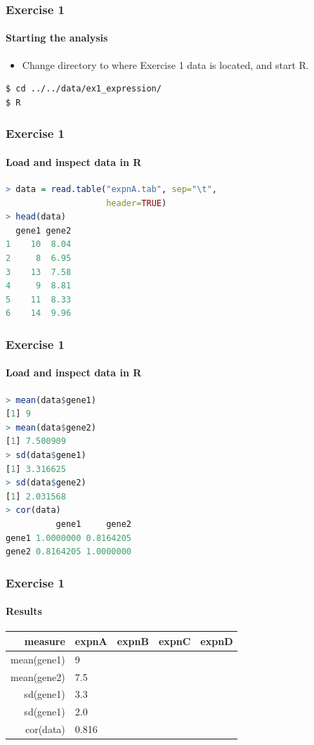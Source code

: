 \documentclass[table]{beamer}
\begin{document}
  \begin{frame}[fragile]
    \frametitle{Exercise 1}
    \framesubtitle{Starting the analysis}
    \begin{itemize}
      \item Change directory to where Exercise 1 data is located, and start R.
    \end{itemize}
    \begin{lstlisting}[language=bash]
$ cd ../../data/ex1_expression/
$ R
    \end{lstlisting}
\end{frame}

  \begin{frame}[fragile]
    \frametitle{Exercise 1}
    \framesubtitle{Load and inspect data in R}
    \begin{lstlisting}[language=R]
> data = read.table("expnA.tab", sep="\t", 
                    header=TRUE)
> head(data)
  gene1 gene2
1    10  8.04
2     8  6.95
3    13  7.58
4     9  8.81
5    11  8.33
6    14  9.96
    \end{lstlisting}
\end{frame}

  \begin{frame}[fragile]
    \frametitle{Exercise 1}
    \framesubtitle{Load and inspect data in R}
    \begin{lstlisting}[language=R]
> mean(data$gene1)
[1] 9
> mean(data$gene2)
[1] 7.500909
> sd(data$gene1)
[1] 3.316625
> sd(data$gene2)
[1] 2.031568
> cor(data)
          gene1     gene2
gene1 1.0000000 0.8164205
gene2 0.8164205 1.0000000
    \end{lstlisting}
\end{frame}

  \begin{frame}
    \frametitle{Exercise 1}
    \framesubtitle{Results}
    \begin{center}
	\begin{tabular}{r|l|l|l|l}
	  measure & expnA & expnB & expnC & expnD \\
	  \hline
	  mean(gene1) & 9     &  &  & \\
	  mean(gene2) & 7.5   &  &  & \\
  	  sd(gene1)   & 3.3   &  &  & \\
  	  sd(gene1)   & 2.0   &  &  & \\  
	  cor(data)   & 0.816 &  &  & \\  
	\end{tabular}
    \end{center}
  \end{frame}
\end{document}
